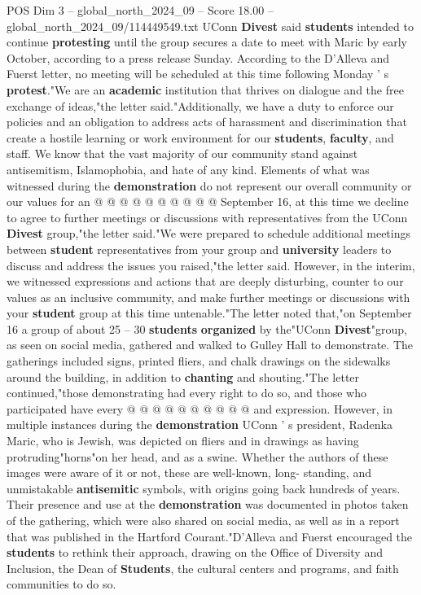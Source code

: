 \begin{textsample}{POS Dim 3 – global\_north\_2024\_09 – Score 18.00 – global\_north\_2024\_09/114449549.txt}
UConn \textbf{Divest} said \textbf{students} intended to continue \textbf{protesting} until the group secures a date to meet with Maric by early October, according to a press release Sunday.
According to the D'Alleva and Fuerst letter, no meeting will be scheduled at this time following Monday ' s \textbf{protest}."We are an \textbf{academic} institution that thrives on dialogue and the free exchange of ideas,"the letter said."Additionally, we have a duty to enforce our policies and an obligation to address acts of harassment and discrimination that create a hostile learning or work environment for our \textbf{students}, \textbf{faculty}, and staff.
We know that the vast majority of our community stand against antisemitism, Islamophobia, and hate of any kind.
Elements of what was witnessed during the \textbf{demonstration} do not represent our overall community or our values for an @ @ @ @ @ @ @ @ @ @ September 16, at this time we decline to agree to further meetings or discussions with representatives from the UConn \textbf{Divest} group,"the letter said."We were prepared to schedule additional meetings between \textbf{student} representatives from your group and \textbf{university} leaders to discuss and address the issues you raised,"the letter said.
However, in the interim, we witnessed expressions and actions that are deeply disturbing, counter to our values as an inclusive community, and make further meetings or discussions with your \textbf{student} group at this time untenable."The letter noted that,"on September 16 a group of about 25 -- 30 \textbf{students} \textbf{organized} by the"UConn \textbf{Divest}"group, as seen on social media, gathered and walked to Gulley Hall to demonstrate.
The gatherings included signs, printed fliers, and chalk drawings on the sidewalks around the building, in addition to \textbf{chanting} and shouting."The letter continued,"those demonstrating had every right to do so, and those who participated have every @ @ @ @ @ @ @ @ @ @ and expression.
However, in multiple instances during the \textbf{demonstration} UConn ' s president, Radenka Maric, who is Jewish, was depicted on fliers and in drawings as having protruding"horns"on her head, and as a swine.
Whether the authors of these images were aware of it or not, these are well-known, long- standing, and unmistakable \textbf{antisemitic} symbols, with origins going back hundreds of years.
Their presence and use at the \textbf{demonstration} was documented in photos taken of the gathering, which were also shared on social media, as well as in a report that was published in the Hartford Courant."D'Alleva and Fuerst encouraged the \textbf{students} to rethink their approach, drawing on the Office of Diversity and Inclusion, the Dean of \textbf{Students}, the cultural centers and programs, and faith communities to do so.

\end{textsample}
